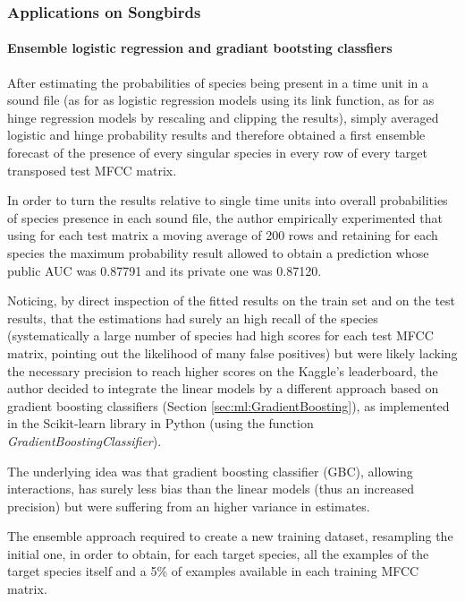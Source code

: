 \subsubsection{Applications on Songbirds}

\paragraph{Ensemble logistic regression and gradiant bootsting classfiers \cite{Massaron13}}

After estimating the probabilities of species being present in a time unit in a
sound file (as for as logistic regression models using its link function, as for as hinge
regression models by rescaling and clipping the results), simply averaged logistic and hinge
probability results and therefore obtained a first ensemble forecast of the presence of every
singular species in every row of every target transposed test MFCC matrix.

In order to turn the results relative to single time units into overall probabilities of species
presence in each sound file, the author empirically experimented that using for each test
matrix a moving average of 200 rows and retaining for each species the maximum
probability result allowed to obtain a prediction whose public AUC was 0.87791 and its
private one was 0.87120.

Noticing, by direct inspection of the fitted results on the train set and on the test results, that
the estimations had surely an high recall of the species (systematically a large number of
species had high scores for each test MFCC matrix, pointing out the likelihood of many false
positives) but were likely lacking the necessary precision to reach higher scores on the
Kaggle’s leaderboard, the author decided to integrate the linear models by a different
approach based on gradient boosting classifiers (Section \ref{sec:ml:GradientBoosting}), as implemented in the Scikit-learn
library in Python \cite{pedregosa2011scikit} (using the function {\em GradientBoostingClassifier}).

The underlying idea was that gradient boosting classifier (GBC), allowing interactions, has
surely less bias than the linear models (thus an increased precision) but were suffering from
an higher variance in estimates.

The ensemble approach required to create a new training dataset, resampling the initial one,
in order to obtain, for each target species, all the examples of the target species itself and a
5\% of examples available in each training MFCC matrix.

